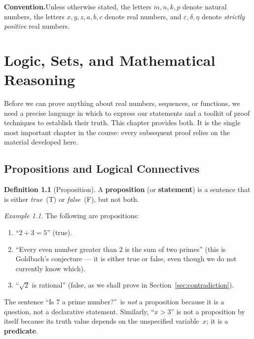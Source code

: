 \documentclass[12pt,a4paper,openany]{book}
\newcommand{\eps}{\varepsilon}
\theoremstyle{definition}
\newtheorem{definition}{Definition}[chapter]
\theoremstyle{remark}
\newtheorem{example}{Example}[chapter]
\begin{document}
\bigskip

\noindent\textbf{Convention.}\quad Unless otherwise stated, the letters
$m,n,k,p$ denote natural numbers, the letters $x,y,z,a,b,c$ denote real
numbers, and $\eps,\delta,\eta$ denote \emph{strictly positive} real numbers.

\mainmatter

\chapter{Logic, Sets, and Mathematical Reasoning}
\label{ch:logic}

Before we can prove anything about real numbers, sequences, or functions,
we need a precise language in which to express our statements and a toolkit
of proof techniques to establish their truth.  This chapter provides both.
It is the single most important chapter in the course: every subsequent
proof relies on the material developed here.

\section{Propositions and Logical Connectives}
\label{sec:propositions}

\begin{definition}[Proposition]\label{def:proposition}
A \textbf{proposition} (or \textbf{statement}) is a
sentence that is either \emph{true}~(T) or \emph{false}~(F), but not both.
\end{definition}

\begin{example}\label{ex:prop-examples}
The following are propositions:
\begin{enumerate}[label=(\alph*)]
\item ``$2+3=5$'' \quad (true).
\item ``Every even number greater than $2$ is the sum of two primes''
  \quad (this is Goldbach's conjecture --- it is either true or false, even
  though we do not currently know which).
\item ``$\sqrt{2}$ is rational'' \quad (false, as we shall prove in
  Section~\ref{sec:contradiction}).
\end{enumerate}
The sentence ``Is $7$ a prime number?''\ is \emph{not} a proposition
because it is a question, not a declarative statement.  Similarly, ``$x>3$''
is not a proposition by itself because its truth value depends on the
unspecified variable~$x$; it is a \textbf{predicate}.
\end{example}
\end{document}
